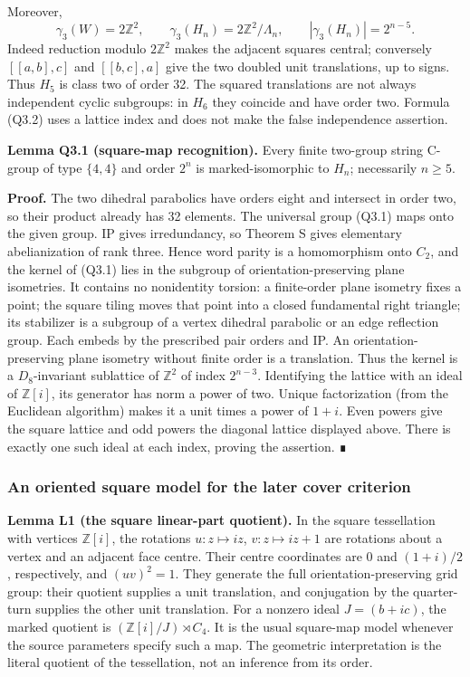 \documentclass[
  10pt,
  letterpaper,
]{article}
\begin{document}
Moreover, \[
 \gamma_3(W)=2\mathbb Z^2,
 \qquad \gamma_3(H_n)=2\mathbb Z^2/\Lambda_n,
 \qquad |\gamma_3(H_n)|=2^{n-5}.                         \tag{Q3.2}
\] Indeed reduction modulo \(2\mathbb Z^2\) makes the adjacent squares
central; conversely \([[a,b],c]\) and \([[b,c],a]\) give the two doubled
unit translations, up to signs. Thus \(H_5\) is class two of order 32.
The squared translations are not always independent cyclic subgroups: in
\(H_6\) they coincide and have order two. Formula (Q3.2) uses a lattice
index and does not make the false independence assertion.

\textbf{Lemma Q3.1 (square-map recognition).} Every finite two-group
string C-group of type \(\{4,4\}\) and order \(2^n\) is
marked-isomorphic to \(H_n\); necessarily \(n\ge5\).

\textbf{Proof.} The two dihedral parabolics have orders eight and
intersect in order two, so their product already has 32 elements. The
universal group (Q3.1) maps onto the given group. IP gives irredundancy,
so Theorem S gives elementary abelianization of rank three. Hence word
parity is a homomorphism onto \(C_2\), and the kernel of (Q3.1) lies in
the subgroup of orientation-preserving plane isometries. It contains no
nonidentity torsion: a finite-order plane isometry fixes a point; the
square tiling moves that point into a closed fundamental right triangle;
its stabilizer is a subgroup of a vertex dihedral parabolic or an edge
reflection group. Each embeds by the prescribed pair orders and IP. An
orientation-preserving plane isometry without finite order is a
translation. Thus the kernel is a \(D_8\)-invariant sublattice of
\(\mathbb Z^2\) of index \(2^{n-3}\). Identifying the lattice with an
ideal of \(\mathbb Z[i]\), its generator has norm a power of two. Unique
factorization (from the Euclidean algorithm) makes it a unit times a
power of \(1+i\). Even powers give the square lattice and odd powers the
diagonal lattice displayed above. There is exactly one such ideal at
each index, proving the assertion. ∎

\subsubsection{An oriented square model for the later cover
criterion}\label{an-oriented-square-model-for-the-later-cover-criterion}

\textbf{Lemma L1 (the square linear-part quotient).} In the square
tessellation with vertices \(\mathbb Z[i]\), the rotations
\(u:z\mapsto iz\), \(v:z\mapsto iz+1\) are rotations about a vertex and
an adjacent face centre. Their centre coordinates are \(0\) and
\((1+i)/2\), respectively, and \((uv)^2=1\). They generate the full
orientation-preserving grid group: their quotient supplies a unit
translation, and conjugation by the quarter-turn supplies the other unit
translation. For a nonzero ideal \(J=(b+ic)\), the marked quotient is
\((\mathbb Z[i]/J)\rtimes C_4\). It is the usual square-map model
whenever the source parameters specify such a map. The geometric
interpretation is the literal quotient of the tessellation, not an
inference from its order.
\end{document}
